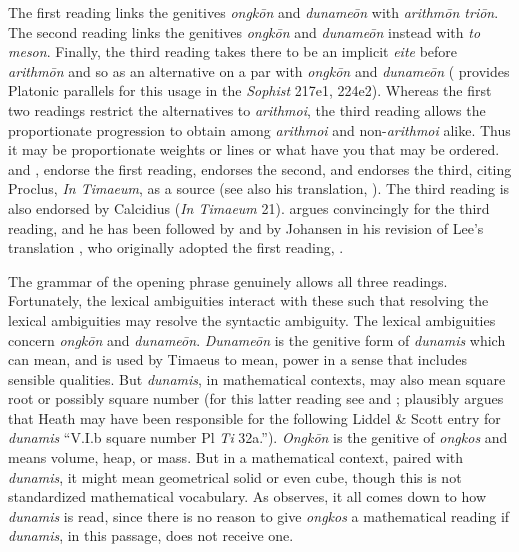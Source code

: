 The first reading links the genitives \emph{ongkōn} and \emph{dunameōn} with \emph{arithmōn triōn}. The second reading links the genitives \emph{ongkōn} and \emph{dunameōn} instead with \emph{to meson}. Finally, the third reading takes there to be an implicit \emph{eite} before \emph{arithmōn} and so as an alternative on a par with \emph{ongkōn} and \emph{dunameōn} (\citealt[99]{Taylor:1928qb} provides Platonic parallels for this usage in the \emph{Sophist} 217e1, 224e2). Whereas the first two readings restrict the alternatives to \emph{arithmoi}, the third reading allows the proportionate progression to obtain among \emph{arithmoi} and non-\emph{arithmoi} alike. Thus it may be proportionate weights or lines or what have you that may be ordered. \citet[97 n12]{Archer-Hind:1888qd} and \citet[59]{Bury:1929jb}, endorse the first reading, \citet[44]{Cornford:1935fk} endorses the second, and \citet[96--99]{Taylor:1928qb} endorses the third, citing Proclus, \emph{In Timaeum}, as a source (see also his translation, \citeyear[28]{Taylor:1929ov}). The third reading is also endorsed by Calcidius (\emph{In Timaeum} 21). \citet{Prtichard:1990aa} argues convincingly for the third reading, and he has been followed by \citet{Zeyl:2000cs} and by Johansen in his revision of Lee's translation \citeyearpar{Lee:2008ca}, who originally adopted the first reading, \citeyearpar{Lee:1965fh}.

The grammar of the opening phrase genuinely allows all three readings. Fortunately, the lexical ambiguities interact with these such that resolving the lexical ambiguities may resolve the syntactic ambiguity. The lexical ambiguities concern \emph{ongkōn} and \emph{dunameōn}. \emph{Dunameōn} is the genitive form of \emph{dunamis} which can mean, and is used by Timaeus to mean, power in a sense that includes sensible qualities. But \emph{dunamis}, in mathematical contexts, may also mean square root or possibly square number (for this latter reading see \citealt[97 n12]{Archer-Hind:1888qd} and \citealt[294 n1]{Heath:1921ys}; \citealt[184]{Prtichard:1990aa} plausibly argues that Heath may have been responsible for the following Liddel \& Scott entry for \emph{dunamis} ``V.I.b square number Pl \emph{Ti} 32a.''). \emph{Ongkōn} is the genitive of \emph{ongkos} and means volume, heap, or mass. But in a mathematical context, paired with \emph{dunamis}, it might mean geometrical solid or even cube, though this is not standardized mathematical vocabulary. As \citet{Prtichard:1990aa} observes, it all comes down to how \emph{dunamis} is read, since there is no reason to give \emph{ongkos} a mathematical reading if \emph{dunamis}, in this passage, does not receive one. 

